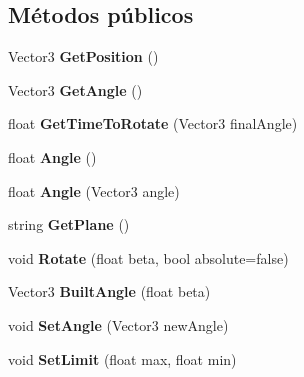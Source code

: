 \subsection*{Métodos públicos}
\begin{DoxyCompactItemize}
\item 
\mbox{\label{class_articulation_a1a7ef254573e5d539a24d6ce58f93911}} 
Vector3 {\bfseries Get\+Position} ()
\item 
\mbox{\label{class_articulation_af80ebaf44266ca6e4042b23d3a3392c9}} 
Vector3 {\bfseries Get\+Angle} ()
\item 
\mbox{\label{class_articulation_a67d26d51e7a88fd6feea21cdd9f43db4}} 
float {\bfseries Get\+Time\+To\+Rotate} (Vector3 final\+Angle)
\item 
\mbox{\label{class_articulation_a530b3282ef1e062b8a752eddb0f624f8}} 
float {\bfseries Angle} ()
\item 
\mbox{\label{class_articulation_a778011e0e6155ccf305808d24cbbda64}} 
float {\bfseries Angle} (Vector3 angle)
\item 
\mbox{\label{class_articulation_ac22a47cd879d9867137cf705070dfb7b}} 
string {\bfseries Get\+Plane} ()
\item 
\mbox{\label{class_articulation_ae796d06441aa563bf7ccfce5f201c26e}} 
void {\bfseries Rotate} (float beta, bool absolute=false)
\item 
\mbox{\label{class_articulation_a421283bcb0bc25871cb63e2664ecf296}} 
Vector3 {\bfseries Built\+Angle} (float beta)
\item 
\mbox{\label{class_articulation_a5091b1cabb19fb26e8937857bf0a3ac5}} 
void {\bfseries Set\+Angle} (Vector3 new\+Angle)
\item 
\mbox{\label{class_articulation_ac3ed162898a61f33eb8b9e74c9e46389}} 
void {\bfseries Set\+Limit} (float max, float min)
\item 
\mbox{\label{class_articulation_ab720697712b16b9ed195dd4ba34a01d4}} 

\end{DoxyCompactItemize}

